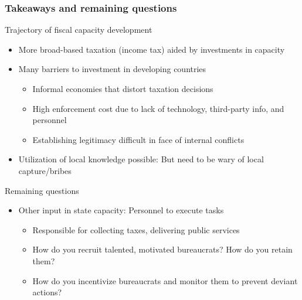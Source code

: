 \documentclass[aspectratio=169]{beamer}
\begin{document}
\begin{frame}
\frametitle{Takeaways and remaining questions} 
Trajectory of fiscal capacity development
\begin{itemize}\setlength\itemsep{3pt}
\item More broad-based taxation (income tax) aided by investments in capacity
\item Many barriers to investment in developing countries
\begin{itemize}\setlength\itemsep{3pt}
\item Informal economies that distort taxation decisions
\item High enforcement cost due to lack of technology, third-party info, and personnel
\item Establishing legitimacy difficult in face of internal conflicts
\end{itemize}
\item Utilization of local knowledge possible: But need to be wary of local capture/bribes
\end{itemize}\medskip
Remaining questions
\begin{itemize}\setlength\itemsep{3pt}
\item Other input in state capacity: Personnel to execute tasks
\begin{itemize}\setlength\itemsep{3pt}
\item Responsible for collecting taxes, delivering public services
\item How do you recruit talented, motivated bureaucrats? How do you retain them?
\item How do you incentivize bureaucrats and monitor them to prevent deviant actions?
\end{itemize}
\end{itemize}
\end{frame}


\end{document}
